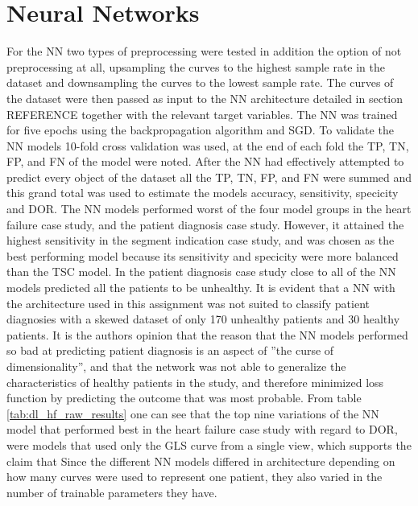 \section{Neural Networks}

For the NN two types of preprocessing were tested in addition the option of not preprocessing at all, upsampling the curves to the highest sample rate in the dataset and downsampling the curves to the lowest sample rate.
The curves of the dataset were then passed as input to the NN architecture detailed in section REFERENCE together with the relevant target variables.
The NN was trained for five epochs using the backpropagation algorithm and SGD.
To validate the NN models 10-fold cross validation was used, at the end of each fold the TP, TN, FP, and FN of the model were noted. 
After the NN had effectively attempted to predict every object of the dataset all the TP, TN, FP, and FN were summed and this grand total was used to estimate the models accuracy, sensitivity, specicity and DOR.
The NN models performed worst of the four model groups in the heart failure case study, and the patient diagnosis case study.
However, it attained the highest sensitivity in the segment indication case study, and was chosen as the best performing model because its sensitivity and specicity were more balanced than the TSC model.
In the patient diagnosis case study close to all of the NN models predicted all the patients to be unhealthy. 
It is evident that a NN with the architecture used in this assignment was not suited to classify patient diagnosies with a skewed dataset of only 170 unhealthy patients and 30 healthy patients.
It is the authors opinion that the reason that the NN models performed so bad at predicting patient diagnosis is an aspect of ''the curse of dimensionality'', and that the network was not able to generalize the characteristics of healthy patients in the study, and therefore minimized loss function by predicting the outcome that was most probable.
From table \ref{tab:dl_hf_raw_results} one can see that the top nine variations of the NN model that performed best in the heart failure case study with regard to DOR, were models that used only the GLS curve from a single view, which supports the claim that 
Since the different NN models differed in architecture depending on how many curves were used to represent one patient, they also varied in the number of trainable parameters they have. 

